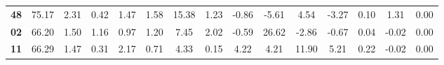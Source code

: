 \documentclass[withoutpreface,bwprint]{cumcmthesis} %
\begin{document}
\begin{appendices}
\begin{table}[!h]
\begin{tabular}{@{}ccccccccccccccc@{}}
			\textbf{48}      & 75.17                                                          & 2.31                                                          & 0.42                                                         & 1.47                                                         & 1.58                                                         & 15.38                                                          & 1.23                                                           & -0.86                                                        & -5.61                                                        & 4.54                                                         & -3.27                                                           & 0.10                                                         & 1.31                                                          & 0.00                                                          \\
			\textbf{02}      & 66.20                                                          & 1.50                                                          & 1.16                                                         & 0.97                                                         & 1.20                                                         & 7.45                                                           & 2.02                                                           & -0.59                                                        & 26.62                                                        & -2.86                                                        & -0.67                                                           & 0.04                                                         & -0.02                                                         & 0.00                                                          \\
			\textbf{11}      & 66.29                                                          & 1.47                                                          & 0.31                                                         & 2.17                                                         & 0.71                                                         & 4.33                                                           & 0.15                                                           & 4.22                                                         & 4.21                                                         & 11.90                                                        & 5.21                                                            & 0.22                                                         & -0.02                                                         & 0.00                                                          \\

\end{tabular}
\end{table}
\end{appendices}
\end{document}

